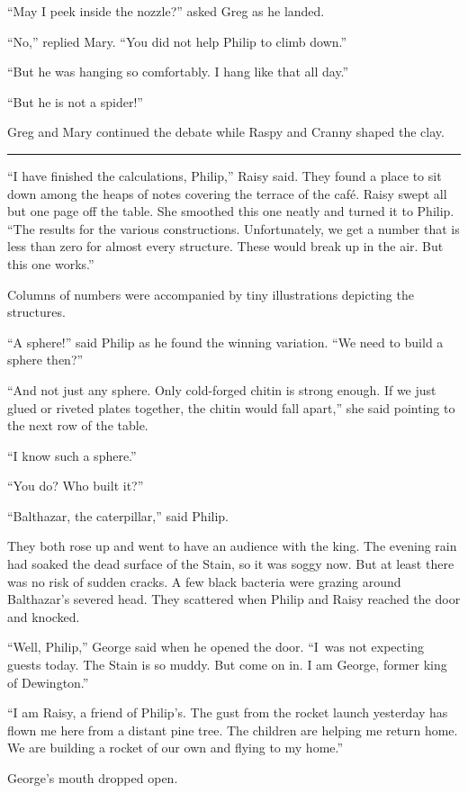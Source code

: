 \documentclass[10pt]{memoir}
\renewcommand{\pfbreakdisplay}{\bigskip \ding{166} \bigskip}
\newcommand{\secbreak}{\fancybreak{\pfbreakdisplay}}
\begin{document}
``May I peek inside the nozzle?'' asked Greg as he landed.

``No,'' replied Mary. ``You did not help Philip to climb down.''

``But he was hanging so comfortably. I hang like that all day.''

``But he is not a spider!''

Greg and Mary continued the debate while Raspy and Cranny shaped the clay.

\secbreak

``I have finished the calculations, Philip,'' Raisy said. They found a place to
sit down among the heaps of notes covering the terrace of the café. Raisy swept
all but one page off the table. She smoothed this one neatly and turned it to
Philip. ``The results for the various constructions. Unfortunately, we get a
number that is less than zero for almost every structure. These would break up
in the air. But this one works.''

Columns of numbers were accompanied by tiny illustrations depicting the
structures.

``A sphere!'' said Philip as he found the winning variation. ``We need to build
a sphere then?''

``And not just any sphere. Only cold-forged chitin is strong enough. If we just
glued or riveted plates together, the chitin would fall apart,'' she said
pointing to the next row of the table.

``I know such a sphere.''

``You do? Who built it?''

``Balthazar, the caterpillar,'' said Philip.

They both rose up and went to have an audience with the king. The evening rain
had soaked the dead surface of the Stain, so it was soggy now. But at least
there was no risk of sudden cracks. A few black bacteria were grazing around
Balthazar's severed head. They scattered when Philip and Raisy reached the door
and knocked.

``Well, Philip,'' George said when he opened the door. ``I~was not expecting
guests today. The Stain is so muddy. But come on in. I am George, former king
of Dewington.''

``I am Raisy, a friend of Philip's. The gust from the rocket launch yesterday
has flown me here from a distant pine tree. The children are helping me return
home. We are building a rocket of our own and flying to my home.''

George's mouth dropped open.
\end{document}
